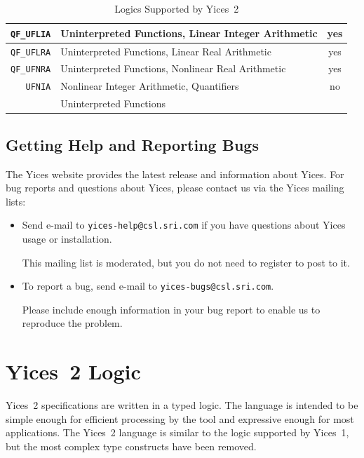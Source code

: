 \documentclass[11pt,twoside,fleqn,openright,titlepage]{cslreport}
\begin{document}
\begin{table}
\begin{center}
\begin{tabular}{|r|l|c|}
\hline
\texttt{QF\_UFLIA} & Uninterpreted Functions, Linear Integer Arithmetic & yes \\
\hline
\texttt{QF\_UFLRA} & Uninterpreted Functions, Linear Real Arithmetic & yes \\
\hline
\texttt{QF\_UFNRA} & Uninterpreted Functions, Nonlinear Real Arithmetic & yes \\
\hline
\texttt{UFNIA} & Nonlinear Integer Arithmetic, Quantifiers & no \\
 & Uninterpreted Functions & \\
\hline
\end{tabular}
\end{center}
\caption{Logics Supported by Yices~2}
\label{supported-logics}
\end{table}

\newpage

\section{Getting Help and Reporting Bugs}

The Yices  website provides the  latest release and  information about
Yices.  For bug  reports and questions about Yices,  please contact us
via the Yices mailing lists:
\begin{itemize}
\item Send e-mail to \texttt{yices-help@csl.sri.com} if you have
  questions about Yices usage or installation.

   This mailing list is moderated, but you do not need to register to
   post to it.

\item To report a bug, send e-mail to \texttt{yices-bugs@csl.sri.com}.

  Please include enough information in your bug report to enable us
  to reproduce the problem.

\end{itemize}



\chapter{Yices~2 Logic}
\label{language}

Yices~2 specifications are  written in a typed logic.  The language is
intended to be simple enough  for efficient processing by the tool and
expressive  enough  for most  applications.  The  Yices~2 language  is
similar to the  logic supported by Yices~1, but  the most complex type
constructs have been removed.
\end{document}
